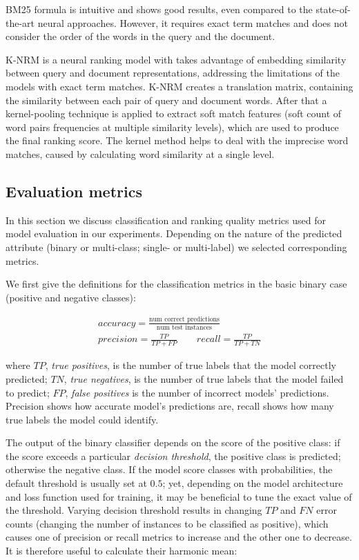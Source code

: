 BM25 formula is intuitive and shows good results, even compared to the state-of-the-art neural approaches. However, it requires exact term matches and does not consider the order of the words in the query and the document.

K-NRM \cite{xiong2017end} is a neural ranking model with takes advantage of embedding similarity between query and document representations, addressing the limitations of the models with exact term matches. K-NRM creates a translation matrix, containing the similarity between each pair of query and document words. After that a kernel-pooling technique is applied to extract soft match features (soft count of word pairs frequencies at multiple similarity levels), which are used to produce the final ranking score. The kernel method helps to deal with the imprecise word matches, caused by calculating word similarity at a single level.

\subsection{Evaluation metrics}

In this section we discuss classification and ranking quality metrics used for model evaluation in our experiments. Depending on the nature of the predicted attribute (binary or multi-class; single- or multi-label) we selected corresponding metrics. 

 We first give the definitions for the classification metrics in the basic binary case (positive and negative classes):

\begin{spreadlines}{15pt}  
\begin{gather}
    accuracy = \frac{\text{num correct predictions}}{\text{num test instances}} \\ 
    precision = \frac{TP}{TP + FP} \quad \quad recall = \frac{TP}{TP + TN}
\end{gather}
\end{spreadlines}


where $TP$, \textit{true positives}, is the number of true labels that the model correctly predicted; $TN$, \textit{true negatives}, is the number of true labels that the model failed to predict; $FP$, \textit{false positives} is the number of incorrect models' predictions. Precision shows how accurate model's predictions are, recall shows how many true labels the model could identify. 

The output of the binary classifier depends on the score of the positive class: if the score exceeds a particular \textit{decision threshold}, the positive class is predicted; otherwise the negative class. If the model score classes with probabilities, the default threshold is usually set at $0.5$; yet, depending on the model architecture and loss function used for training, it may be beneficial to tune the exact value of the threshold. Varying decision threshold results in changing $TP$ and $FN$ error counts (changing the number of instances to be classified as positive), which causes one of precision or recall metrics to increase and the other one to decrease. It is therefore useful to calculate their harmonic mean:

